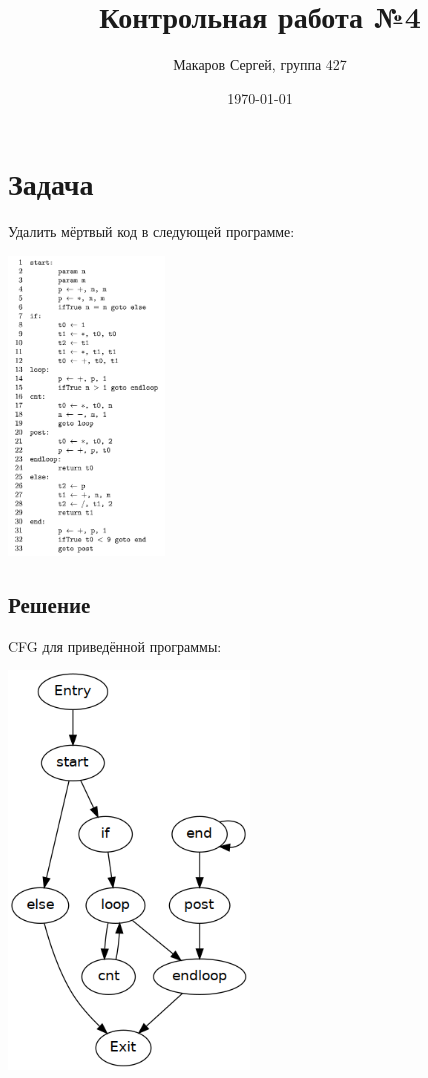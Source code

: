 \documentclass[11pt]{article}
\author{Макаров Сергей, группа 427}
\date{\today}
\title{Контрольная работа №4}
\begin{document}
\maketitle

\section{Задача}
\label{sec:org395a07a}
Удалить мёртвый код в следующей программе:
\begin{center}
\includegraphics[height=300px]{./code.png}
\end{center}
\pagebreak
\subsection{Решение}
\label{sec:orgdbd128b}
CFG для приведённой программы:
\begin{center}
\includegraphics[height=400px]{cfg4.png}
\end{center}
\end{document}
